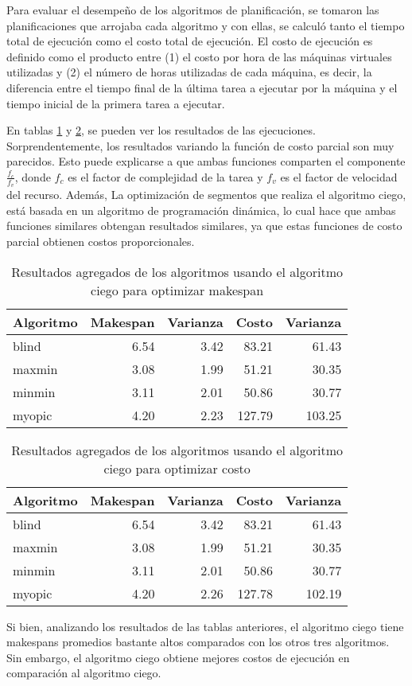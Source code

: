 Para evaluar el desempeño de los algoritmos de planificación, se tomaron las planificaciones que arrojaba cada algoritmo y con ellas, se calculó tanto el tiempo total de ejecuci\'on como el costo total de ejecución. El costo de ejecución es definido como el producto entre (1) el costo por hora de las máquinas virtuales utilizadas y (2) el número de horas utilizadas de cada máquina, es decir, la diferencia entre el tiempo final de la última tarea a ejecutar por la máquina y el tiempo inicial de la primera tarea a ejecutar.

En tablas \ref{table:results_makespan} y \ref{table:results_cost}, se pueden ver los resultados de las ejecuciones. Sorprendentemente, los resultados variando la funci\'on de costo parcial son muy parecidos. Esto puede explicarse a que ambas funciones comparten el componente $\frac{f_c}{f_v}$, donde $f_c$ es el factor de complejidad de la tarea y $f_v$ es el factor de velocidad del recurso. Adem\'as, La optimizaci\'on de segmentos que realiza el algoritmo ciego, est\'a basada en un algoritmo de programaci\'on din\'amica, lo cual hace que ambas funciones similares obtengan resultados similares, ya que estas funciones de costo parcial obtienen costos proporcionales.


\begin{table}[ht]
\centering
\begin{tabular}{lrrrr}
  \hline
Algoritmo & Makespan & Varianza & Costo & Varianza \\ 
  \hline
blind & 6.54 & 3.42 & 83.21 & 61.43 \\ 
  maxmin & 3.08 & 1.99 & 51.21 & 30.35 \\ 
  minmin & 3.11 & 2.01 & 50.86 & 30.77 \\ 
  myopic & 4.20 & 2.23 & 127.79 & 103.25 \\ 
   \hline
\end{tabular}
\caption{Resultados agregados de los algoritmos usando el algoritmo ciego para optimizar makespan} 
\label{table:results_makespan}
\end{table}


\begin{table}[ht]
\centering
\begin{tabular}{lrrrr}
  \hline
Algoritmo & Makespan & Varianza & Costo & Varianza \\ 
  \hline
blind & 6.54 & 3.42 & 83.21 & 61.43 \\ 
  maxmin & 3.08 & 1.99 & 51.21 & 30.35 \\ 
  minmin & 3.11 & 2.01 & 50.86 & 30.77 \\ 
  myopic & 4.20 & 2.26 & 127.78 & 102.19 \\ 
   \hline
\end{tabular}
\caption{Resultados agregados de los algoritmos usando el algoritmo ciego para optimizar costo} 
\label{table:results_cost}
\end{table}


Si bien, analizando los resultados de las tablas anteriores, el algoritmo ciego tiene makespans promedios bastante altos comparados con los otros tres algoritmos. Sin embargo, el algoritmo ciego obtiene mejores costos de ejecución en comparación al algoritmo ciego.
